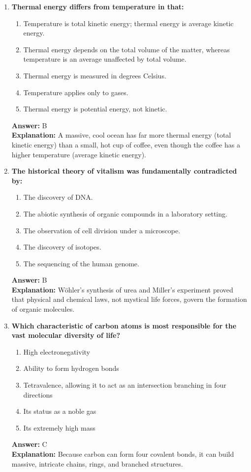 \documentclass[11pt, a4paper]{article}
\begin{document}
\begin{enumerate}
\item \textbf{Thermal energy differs from temperature in that:}
\begin{enumerate}[label=\Alph*.]
    \item Temperature is total kinetic energy; thermal energy is average kinetic energy.
    \item Thermal energy depends on the total volume of the matter, whereas temperature is an average unaffected by total volume.
    \item Thermal energy is measured in degrees Celsius.
    \item Temperature applies only to gases.
    \item Thermal energy is potential energy, not kinetic.
\end{enumerate}
\textbf{Answer:} B \\
\textbf{Explanation:} A massive, cool ocean has far more thermal energy (total kinetic energy) than a small, hot cup of coffee, even though the coffee has a higher temperature (average kinetic energy).


\item \textbf{The historical theory of vitalism was fundamentally contradicted by:}
\begin{enumerate}[label=\Alph*.]
    \item The discovery of DNA.
    \item The abiotic synthesis of organic compounds in a laboratory setting.
    \item The observation of cell division under a microscope.
    \item The discovery of isotopes.
    \item The sequencing of the human genome.
\end{enumerate}
\textbf{Answer:} B \\
\textbf{Explanation:} Wöhler's synthesis of urea and Miller's experiment proved that physical and chemical laws, not mystical life forces, govern the formation of organic molecules.

\item \textbf{Which characteristic of carbon atoms is most responsible for the vast molecular diversity of life?}
\begin{enumerate}[label=\Alph*.]
    \item High electronegativity
    \item Ability to form hydrogen bonds
    \item Tetravalence, allowing it to act as an intersection branching in four directions
    \item Its status as a noble gas
    \item Its extremely high mass
\end{enumerate}
\textbf{Answer:} C \\
\textbf{Explanation:} Because carbon can form four covalent bonds, it can build massive, intricate chains, rings, and branched structures.


\end{enumerate}
\end{document}

